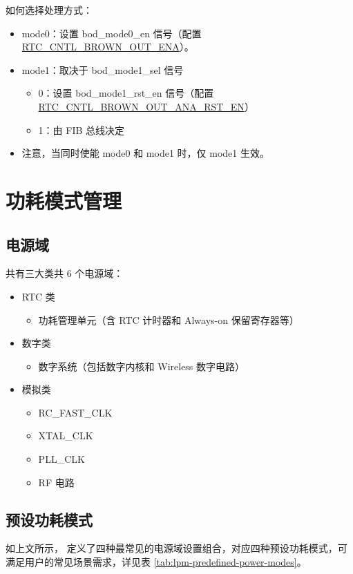 \documentclass[main\_\_CN.tex]{subfiles}
\begin{document}
如何选择处理方式：
\begin{itemize}
    \item mode0：设置 bod\_mode0\_en 信号（配置 \hyperref[fielddesc:RTCCNTLBROWNOUTENA]{RTC\_CNTL\_BROWN\_OUT\_ENA}）。
    \item mode1：取决于 bod\_mode1\_sel 信号
    \begin{itemize}
        \item 0：设置 bod\_mode1\_rst\_en 信号（配置 \hyperref[fielddesc:RTCCNTLBROWNOUTANARSTEN]{RTC\_CNTL\_BROWN\_OUT\_ANA\_RST\_EN}）
        \item 1：由 FIB 总线决定
    \end{itemize}
    \item 注意，当同时使能 mode0 和 mode1 时，仅 mode1 生效。
\end{itemize}

\section{功耗模式管理}

\subsection{电源域}\label{sec:lpm-power-domain}

\chipname{}  共有三大类共 6 个电源域：
\begin{itemize}
\item RTC 类
\begin{itemize}
\item 功耗管理单元（含 RTC 计时器和 Always-on 保留寄存器等）
\end{itemize}
\item 数字类
\begin{itemize}
\item 数字系统（包括数字内核和 Wireless 数字电路）
\end{itemize}
\item 模拟类
\begin{itemize}
\item RC\_FAST\_CLK
\item XTAL\_CLK
\item PLL\_CLK
\item RF 电路
\end{itemize}
\end{itemize}

\subsection{预设功耗模式}
如上文所示，\chipname{}  定义了四种最常见的电源域设置组合，对应四种预设功耗模式，可满足用户的常见场景需求，详见表 \ref{tab:lpm-predefined-power-modes}。
\end{document}
